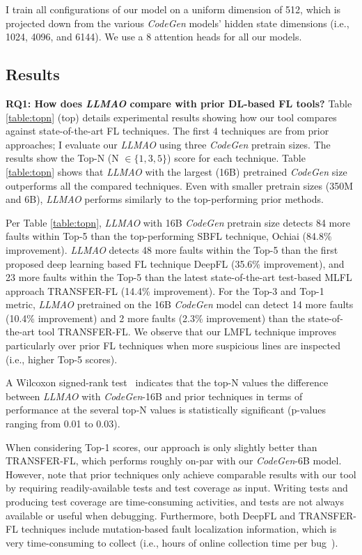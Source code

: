 \documentclass[12pt,openany,oneside,table]{cmuthesis}
\begin{document}
    I train all configurations of our model on a uniform dimension of 512, which is projected down from the various \textit{CodeGen} models' hidden state dimensions (i.e., 1024, 4096, and 6144). We use a 8 attention heads for all our models.
    
    
    \subsection{Results}
    \textbf{RQ1: How does \textit{LLMAO} compare with prior DL-based FL tools?}
    Table \ref{table:topn} (top) details experimental results showing how our tool compares against state-of-the-art FL techniques. The first 4 techniques are from prior approaches; I evaluate our \textit{LLMAO} using three \textit{CodeGen} pretrain sizes. The results show the Top-N (N $\in \{1,3,5\}$) score for each technique. 
    Table \ref{table:topn} shows that \textit{LLMAO} with the largest (16B) pretrained \textit{CodeGen} size outperforms all the compared techniques. Even with smaller pretrain sizes (350M and 6B), \textit{LLMAO} performs similarly to the top-performing prior methods.
    
    Per Table \ref{table:topn}, \textit{LLMAO} with 16B \textit{CodeGen} pretrain size detects 84 more faults within Top-5 than the top-performing SBFL technique, Ochiai (84.8\% improvement). \textit{LLMAO} detects 48 more faults within the Top-5 than the first proposed deep learning based FL technique DeepFL (35.6\% improvement), and 23 more faults within the Top-5 than the latest state-of-the-art test-based MLFL approach TRANSFER-FL (14.4\% improvement). 
    For the Top-3 and Top-1 metric, \textit{LLMAO} pretrained on the 16B \textit{CodeGen} model can detect 14 more faults (10.4\% improvement) and 2 more faults (2.3\% improvement) than the state-of-the-art tool TRANSFER-FL. We observe that our LMFL technique improves particularly over prior FL techniques when more suspicious lines are inspected (i.e., higher Top-5 scores). 
    
    A Wilcoxon signed-rank test~\cite{woolson2007wilcoxon} indicates that the top-N values the difference between \textit{LLMAO} with \textit{CodeGen}-16B and prior techniques in terms of performance at the several top-N values is statistically significant (p-values ranging from 0.01 to 0.03).
    
    When considering Top-1 scores, our approach is only slightly better than TRANSFER-FL, which performs roughly on-par with our \textit{CodeGen}-6B model. 
    However, note that prior techniques only achieve comparable results with our tool by requiring readily-available tests and test coverage as input. Writing tests and producing test coverage are time-consuming activities, and tests are not always available or useful when debugging. Furthermore, both DeepFL and TRANSFER-FL techniques include mutation-based fault localization information, which is very time-consuming to collect (i.e., hours of online collection time per bug~\cite{li2019deepfl}).
    
\end{document}
